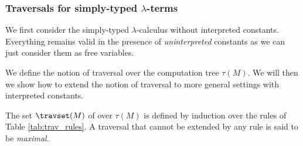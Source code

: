 \subsubsection{Traversals for simply-typed $\lambda$-terms}

We first consider the simply-typed $\lambda$-calculus without interpreted constants.
Everything remains valid in the presence of \emph{uninterpreted} constants as we can just
consider them as free variables.

We define the notion of traversal over the computation tree $\tau(M)$.
We will then we show how to extend the notion of traversal to more general settings with interpreted constants.

\begin{definition} \rm
\label{def:traversal} The set $\travset(M)$ of 
over $\tau(M)$ is defined by induction over the rules of Table \ref{tab:trav_rules}.
A traversal that cannot be extended by any rule is said to be \emph{maximal}.
\end{definition}

